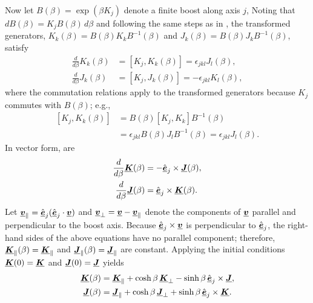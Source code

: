 Now let $B(\beta)=\exp(\beta K_j)$ denote a finite boost along axis $j$,
%
Noting that $dB(\beta) = K_j B(\beta) \, d\beta$ and following the same steps as in ,
the transformed generators, $K_k(\beta) = B(\beta) K_k B^{-1}(\beta)$ and $J_k(\beta) = B(\beta) J_k B^{-1}(\beta)$, satisfy
\begin{align}
\frac{d}{d\beta} K_k(\beta) &= [K_j, K_k(\beta)] = \epsilon_{jkl} J_l(\beta), \label{eqn:ode_boost_K} \\
\frac{d}{d\beta} J_k(\beta) &= [K_j, J_k(\beta)] = -\epsilon_{jkl} K_l(\beta), \label{eqn:ode_boost_J}
\end{align}
%
where the commutation relations apply to the transformed generators because $K_j$ commutes with $B(\beta)$; e.g.,
\begin{equation*}
\begin{split}
[K_j, K_k(\beta)] &= B(\beta) [K_j, K_k] B^{-1}(\beta) \\
                  &= \epsilon_{jkl} B(\beta) J_l B^{-1}(\beta) = \epsilon_{jkl} J_l(\beta).
\end{split}
\end{equation*}
%
In vector form,  are
\begin{align}
\frac{d}{d\beta} \underline{\mbox{\boldmath $K$}}(\beta) &= - \hat{\underline{\mbox{\boldmath $e$}}}_j \times \underline{\mbox{\boldmath $J$}}(\beta), \\
\frac{d}{d\beta} \underline{\mbox{\boldmath $J$}}(\beta) &= \hat{\underline{\mbox{\boldmath $e$}}}_j \times \underline{\mbox{\boldmath $K$}}(\beta).
\end{align}
%
Let
$\underline{\mbox{\boldmath $v$}}_\parallel = \hat{\underline{\mbox{\boldmath $e$}}}_j (\hat{\underline{\mbox{\boldmath $e$}}}_j \cdot \underline{\mbox{\boldmath $v$}})$ and $\underline{\mbox{\boldmath $v$}}_\perp = \underline{\mbox{\boldmath $v$}} - \underline{\mbox{\boldmath $v$}}_\parallel$
denote the components of $\underline{\mbox{\boldmath $v$}}$ parallel and perpendicular to the boost axis.
%
Because $\hat{\underline{\mbox{\boldmath $e$}}}_j \times \underline{\mbox{\boldmath $v$}}$ is perpendicular to $\hat{\underline{\mbox{\boldmath $e$}}}_j$, the right-hand sides of the above
equations have no parallel component; therefore, $\underline{\mbox{\boldmath $K$}}_\parallel(\beta) = \underline{\mbox{\boldmath $K$}}_\parallel$ and
$\underline{\mbox{\boldmath $J$}}_\parallel(\beta) = \underline{\mbox{\boldmath $J$}}_\parallel$ are constant.
%
Applying the initial conditions
$\underline{\mbox{\boldmath $K$}}(0)=\underline{\mbox{\boldmath $K$}}$ and $\underline{\mbox{\boldmath $J$}}(0)=\underline{\mbox{\boldmath $J$}}$ yields
\begin{align}
\underline{\mbox{\boldmath $K$}}(\beta) &= \underline{\mbox{\boldmath $K$}}_\parallel + \cosh\beta \, \underline{\mbox{\boldmath $K$}}_\perp - \sinh\beta \, \hat{\underline{\mbox{\boldmath $e$}}}_j \times \underline{\mbox{\boldmath $J$}},
\label{eqn:generator_boost_K} \\
\underline{\mbox{\boldmath $J$}}(\beta) &= \underline{\mbox{\boldmath $J$}}_\parallel + \cosh\beta \, \underline{\mbox{\boldmath $J$}}_\perp + \sinh\beta \, \hat{\underline{\mbox{\boldmath $e$}}}_j \times \underline{\mbox{\boldmath $K$}}.
\label{eqn:generator_boost_J}
\end{align}


